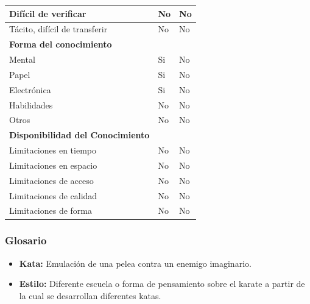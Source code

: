 \documentclass[12pt,a4paper,twoside,spanish]{article}      %
\newcommand{\PreserveBackslash}[1]{\let\temp=\\#1\let\\=\temp}
\let\PBS=\PreserveBackslash
\begin{document}
\begin{table}[H]
\begin{tabularx}{\textwidth}{|p{5cm}|>{\PBS\raggedright}p{0.8cm}|X|}
                Difícil de verificar& No & No\\ \hline 

                Tácito, difícil de transferir& No & No \\ \hline 

                \textbf{Forma del conocimiento} & &\\ \hline

                Mental& Si & No\\ \hline

                Papel& Si & No\\ \hline 

                Electrónica& Si  & No\\ \hline

                Habilidades&No  & No\\ \hline 

                Otros& No & No\\ \hline 

                \textbf{Disponibilidad del Conocimiento} &  &\\ \hline 

                Limitaciones en tiempo& No  & No\\ \hline

                Limitaciones en espacio& No & No \\ \hline 

                Limitaciones de acceso& No & No \\ \hline 

                Limitaciones de calidad& No & No \\ \hline 

                Limitaciones de forma& No & No \\ \hline

            \end{tabularx}
            \label{tab.TM2}
        \end{table}
\subsubsection{Glosario}

\begin{itemize}
\item \textbf{Kata:} Emulación de una pelea contra un enemigo imaginario.
  \item \textbf{Estilo:} Diferente escuela o forma de pensamiento sobre el karate a partir de la cual se desarrollan diferentes katas.
\end{itemize}
\end{document}
